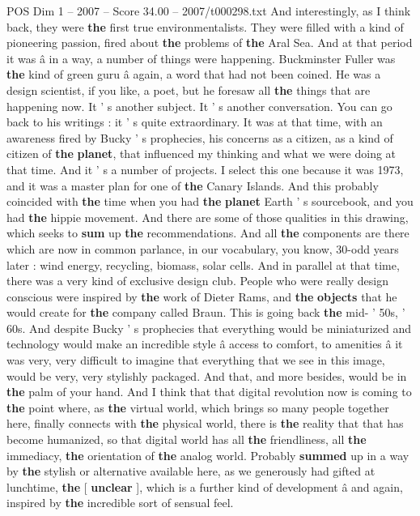 \begin{textsample}{POS Dim 1 – 2007 – Score 34.00 – 2007/t000298.txt}
And interestingly, as I think back, they were \textbf{the} first true environmentalists.
They were filled with a kind of pioneering passion, fired about \textbf{the} problems of \textbf{the} Aral Sea.
And at that period it was â in a way, a number of things were happening.
Buckminster Fuller was \textbf{the} kind of green guru â again, a word that had not been coined.
He was a design scientist, if you like, a poet, but he foresaw all \textbf{the} things that are happening now.
It ' s another subject.
It ' s another conversation.
You can go back to his writings : it ' s quite extraordinary.
It was at that time, with an awareness fired by Bucky ' s prophecies, his concerns as a citizen, as a kind of citizen of \textbf{the} \textbf{planet}, that influenced my thinking and what we were doing at that time.
And it ' s a number of projects.
I select this one because it was 1973, and it was a master plan for one of \textbf{the} Canary Islands.
And this probably coincided with \textbf{the} time when you had \textbf{the} \textbf{planet} Earth ' s sourcebook, and you had \textbf{the} hippie movement.
And there are some of those qualities in this drawing, which seeks to \textbf{sum} up \textbf{the} recommendations.
And all \textbf{the} components are there which are now in common parlance, in our vocabulary, you know, 30-odd years later : wind energy, recycling, biomass, solar cells.
And in parallel at that time, there was a very kind of exclusive design club.
People who were really design conscious were inspired by \textbf{the} work of Dieter Rams, and \textbf{the} \textbf{objects} that he would create for \textbf{the} company called Braun.
This is going back \textbf{the} mid- ' 50s, ' 60s.
And despite Bucky ' s prophecies that everything would be miniaturized and technology would make an incredible style â access to comfort, to amenities â it was very, very difficult to imagine that everything that we see in this image, would be very, very stylishly packaged.
And that, and more besides, would be in \textbf{the} palm of your hand.
And I think that that digital revolution now is coming to \textbf{the} point where, as \textbf{the} virtual world, which brings so many people together here, finally connects with \textbf{the} physical world, there is \textbf{the} reality that that has become humanized, so that digital world has all \textbf{the} friendliness, all \textbf{the} immediacy, \textbf{the} orientation of \textbf{the} analog world.
Probably \textbf{summed} up in a way by \textbf{the} stylish or alternative available here, as we generously had gifted at lunchtime, \textbf{the} [ \textbf{unclear} ], which is a further kind of development â and again, inspired by \textbf{the} incredible sort of sensual feel.

\end{textsample}
